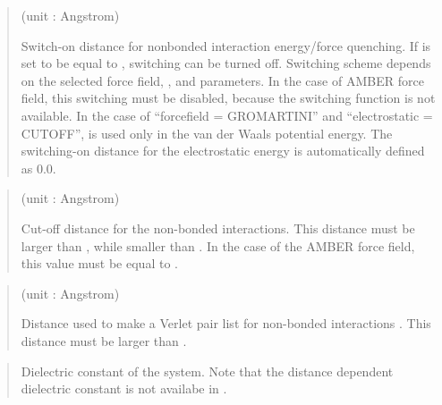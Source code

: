 \documentclass[a4paper,11pt,oneside,english]{sphinxmanual}
\begin{document}
 
\begin{quote}

 (unit : Angstrom)

Switch-on distance for nonbonded interaction energy/force quenching.
If  is set to be equal to , switching can be turned off.
Switching scheme depends on the selected force field, , and  parameters.
In the case of AMBER force field, this switching must be disabled, because the switching function is not available.
In the case of “forcefield = GROMARTINI” and “electrostatic = CUTOFF”,  is used only in the van der Waals potential energy.
The switching-on distance for the electrostatic energy is automatically defined as 0.0.
\end{quote}

 
\begin{quote}

 (unit : Angstrom)

Cut-off distance for the non-bonded interactions.
This distance must be larger than , while smaller than .
In the case of the AMBER force field, this value must be equal to .
\end{quote}

 
\begin{quote}

 (unit : Angstrom)

Distance used to make a Verlet pair list for non-bonded interactions .
This distance must be larger than .
\end{quote}

 
\begin{quote}


Dielectric constant of the system.
Note that the distance dependent dielectric constant is not availabe in .
\end{quote}
\end{document}
